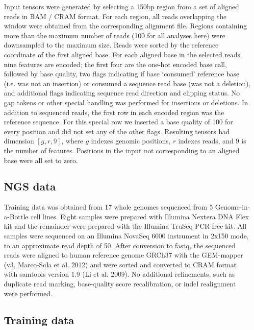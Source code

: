 \documentclass[]{article}
\begin{document}
Input tensors were generated by selecting a 150bp region from a set of aligned reads in BAM / CRAM format. For each region, all reads overlapping the window were obtained from the corresponding alignment file. Regions containing more than the maximum number of reads (100 for all analyses here) were downsampled to the maximum size.  Reads were sorted by the reference coordinate of the first aligned base. For each aligned base in the selected reads nine features are encoded; the first four are the one-hot encoded base call, followed by base quality, two flags indicating if base `consumed' reference base (i.e. was not an insertion) or consumed a sequence read base (was not a deletion), and additional flags indicating sequence read direction and clipping status.  No gap tokens or other special handling was performed for insertions or deletions. In addition to sequenced reads, the first row in each encoded region was the reference sequence. For this special row we inserted a base quality of 100 for every position and did not set any of the other flags. Resulting tensors had dimension $[g, r, 9]$, where $g$ indexes genomic positions, $r$ indexes reads, and 9 is the number of features. Positions in the input not corresponding to an aligned base were all set to zero. 


\subsection{NGS data}

Training data was obtained from 17 whole genomes sequenced from 5 Genome-in-a-Bottle cell lines. Eight samples were prepared with Illumina Nextera DNA Flex kit and the remainder were prepared with the Illumina TruSeq PCR-free kit. All samples were sequenced on an Illumina NovaSeq 6000 instrument in 2x150 mode, to an approximate read depth of 50. After conversion to fastq, the sequenced reads were aligned to human reference genome GRCh37 with the GEM-mapper (v3, Marco-Sola et al. 2012) and were sorted and converted to CRAM format with samtools version 1.9 (Li et al. 2009). No additional refinements, such as duplicate read marking, base-quality score recalibration, or indel realignment were performed.

\subsection{Training data}
\end{document}
